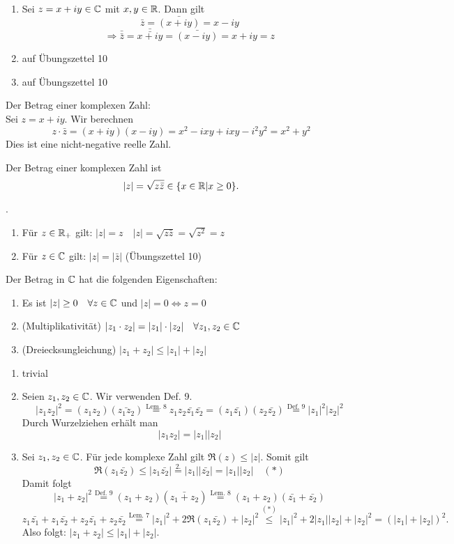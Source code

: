 \documentclass[../ana1.tex]{subfiles}
\begin{document}
\begin{bew}
	\begin{enumerate}
		\item Sei \( z= x+iy \in\mathbb{C} \) mit \(x,y \in\mathbb{R} \). Dann gilt
		\[ \bar{z} = \bar{(x+iy)} = x-iy \]
		\[ \Rightarrow \bar{\bar{z}} = \bar{\bar{x+iy}} = \bar{(x-iy)} = x+iy = z \]
		\item auf Übungszettel 10
		\item auf Übungszettel 10
	\end{enumerate}
\end{bew}
Der Betrag einer komplexen Zahl:\\
Sei \( z=x+iy \). Wir berechnen
\[ z\cdot \bar{z} = (x+iy)(x-iy)=x^2-ixy +ixy - i^2y^2 = x^2 + y^2 \]
Dies ist eine nicht-negative reelle Zahl.
\begin{defi}
	Der Betrag einer komplexen Zahl ist
	\[ |z| = \sqrt{z \bar{z}}\in\{x\in\mathbb{R} | x\geq 0 \}. \]
\end{defi}
\begin{bem}.%
	\begin{enumerate}
		\item Für \( z\in\mathbb{R}_+ \) gilt: \( |z| = z \quad |z| = \sqrt{z\bar{z}} = \sqrt{z^2} = z \)
		\item Für \( z\in\mathbb{C} \) gilt: \( |z| = |\bar{z}| \) (Übungszettel 10)
	\end{enumerate}
\end{bem}
\begin{satz}
	Der Betrag in \(\mathbb{C}\) hat die folgenden Eigenschaften:
	\begin{enumerate}
		\item Es ist \( |z|\geq 0 \quad \forall z\in\mathbb{C} \) und \( |z|=0 \Leftrightarrow z=0 \)
		\item (Multiplikativität) \( |z_1 \cdot z_2| = |z_1|\cdot|z_2| \quad \forall z_1,z_2\in\mathbb{C} \)
		\item (Dreiecksungleichung) \( |z_1+z_2| \leq |z_1| + |z_2| \)
	\end{enumerate}
\end{satz}
\begin{bew}
	\begin{enumerate}
		\item trivial
		\item Seien \( z_1,z_2 \in\mathbb{C} \). Wir verwenden Def. 9.
		\[ |z_1z_2|^2 = (z_1z_2)(\bar{z_1z_2}) \overset{\text{Lem. 8}}{=}z_1z_2 \bar{z_1} \bar{z_2} = (z_1\bar{z_1})(z_2\bar{z_2}) \overset{\text{Def. 9}}{=} |z_1|^2|z_2|^2 \]
		Durch Wurzelziehen erhält man
		\[ |z_1z_2| = |z_1||z_2| \]
		\item Sei \( z_1,z_2 \in\mathbb{C} \). Für jede komplexe Zahl gilt \( \Re(z) \leq |z| \). Somit gilt
		\[ \Re(z_1\bar{z_2}) \leq |z_1\bar{z_2}| \overset{2.}{=}|z_1||\bar{z_2}| = |z_1||z_2| \quad(*) \]
		Damit folgt \[ |z_1 + z_2|^2 \overset{\text{Def. 9}}{=} (z_1 + z_2)(\bar{z_1+z_2}) \overset{\text{Lem. 8}}{=} (z_1 + z_2)(\bar{z_1} + \bar{z_2}) \]
		\[ z_1 \bar{z_1} + z_1 \bar{z_2} + z_2 \bar{z_1} + z_2 \bar{z_2} \overset{\text{Lem. 7}}{=} |z_1|^2 + 2\Re(z_1\bar{z_2}) + |z_2|^2 \overset{(*)}{\leq} |z_1|^2 + 2|z_1||z_2| + |z_2|^2 = (|z_1| + |z_2|)^2. \]
		Also folgt: \( |z_1+z_2| \leq |z_1| + |z_2|. \)
	\end{enumerate}
\end{bew}
\end{document}
